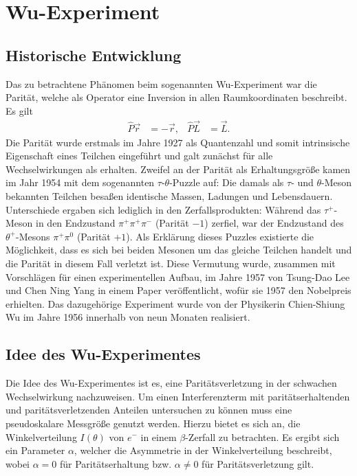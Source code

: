 
\section{Wu-Experiment}


\subsection{Historische Entwicklung}
Das zu betrachtene Phänomen beim sogenannten Wu-Experiment war die Parität, welche als Operator eine Inversion in allen Raumkoordinaten beschreibt. Es gilt
\begin{align*}
	\hat{P} \vec{r} &= -\vec{r}, &
	\hat{P} \vec{L} &= \vec{L}.
\end{align*}
Die Parität wurde erstmals im Jahre 1927 als Quantenzahl und somit intrinsische Eigenschaft eines Teilchen eingeführt und galt zunächst für alle Wechselwirkungen als erhalten.
Zweifel an der Parität als Erhaltungsgröße kamen im Jahr 1954 mit dem sogenannten $\tau$-$\theta$-Puzzle auf:
Die damals als $\tau$- und $\theta$-Meson bekannten Teilchen besaßen identische Massen, Ladungen und Lebensdauern.
Unterschiede ergaben sich lediglich in den Zerfallsprodukten:
Während das $\tau^+$-Meson in den Endzustand $\pi^+ \pi^+ \pi^-$ (Parität $-1$) zerfiel, war der Endzustand des $\theta^+$-Mesons $\pi^+ \pi^0$ (Parität $+1$).
Als Erklärung dieses Puzzles existierte die Möglichkeit, dass es sich bei beiden Mesonen um das gleiche Teilchen handelt und die Parität in diesem Fall verletzt ist.
Diese Vermutung wurde, zusammen mit Vorschlägen für einen experimentellen Aufbau, im Jahre 1957 von Tsung-Dao Lee und Chen Ning Yang in einem Paper veröffentlicht, wofür sie 1957 den Nobelpreis erhielten.
Das dazugehörige Experiment wurde von der Physikerin Chien-Shiung Wu im Jahre 1956 innerhalb von neun Monaten realisiert.

\subsection{Idee des Wu-Experimentes}
Die Idee des Wu-Experimentes ist es, eine Paritätsverletzung in der schwachen Wechselwirkung nachzuweisen.
Um einen Interferenzterm mit paritätserhaltenden und paritätsverletzenden Anteilen untersuchen zu können muss eine pseudoskalare Messgröße genutzt werden.
Hierzu bietet es sich an, die Winkelverteilung $I\left(\theta \right)$ von $e^-$ in einem $\beta$-Zerfall zu betrachten. 
Es ergibt sich ein Parameter $\alpha$, welcher die Asymmetrie in der Winkelverteilung beschreibt, wobei $\alpha = 0$ für Paritätserhaltung bzw. $\alpha \neq 0$ für Paritätsverletzung gilt.

